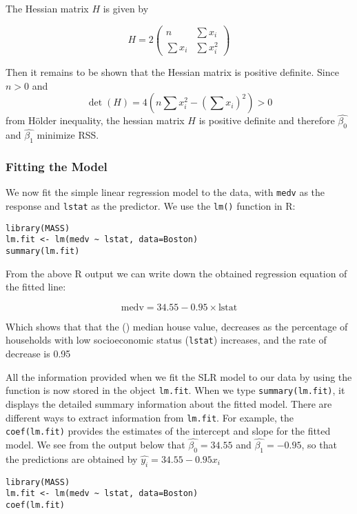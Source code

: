 \documentclass[11pt]{article}
\begin{document}
The Hessian matrix \( H \) is given by

\[H = 2 \begin{pmatrix}
n & \sum x_i \\
\sum x_i & \sum x_i^2
\end{pmatrix}\]

Then it remains to be shown that the Hessian matrix is positive definite. Since \(n > 0\) and \[\det(H) = 4(n \sum x_i^2 - (\sum x_i)^2) > 0\] from Hölder inequality, the hessian matrix $H$ is positive definite and therefore \(\hat{\beta_0}\) and \( \hat{\beta_1}\) minimize RSS.

\subsubsection{Fitting the Model}

We now fit the simple linear regression model to the data, with \texttt{medv} as the response and \texttt{lstat} as the predictor. We use the \texttt{lm()} function in R:

\begin{verbatim}
library(MASS)
lm.fit <- lm(medv ~ lstat, data=Boston)
summary(lm.fit)
\end{verbatim}

From the above R output we can write down the obtained regression equation of the ﬁtted line:

\[\text{medv} = 34.55 - 0.95 \times \text{lstat}\]

Which shows that that the () median house value, decreases as the percentage of households with low socioeconomic status (\texttt{lstat}) increases, and the rate of decrease is 0.95

All the information provided when we ﬁt the SLR model to our data by using the  function is now stored in the object \texttt{lm.fit}.
When we type \texttt{summary(lm.fit)}, it displays the detailed summary information about the fitted model. There are diﬀerent ways to extract information from \texttt{lm.fit}. For example, the \texttt{coef(lm.fit)} provides the estimates of the intercept and slope for the fitted model. We see from the output below that $\hat{\beta_0} = 34.55$ and $\hat{\beta_1} = -0.95$, so that the predictions are obtained by $\hat{y_i} = 34.55 - 0.95x_i$

\begin{verbatim}
library(MASS)
lm.fit <- lm(medv ~ lstat, data=Boston)
coef(lm.fit)
\end{verbatim}
\end{document}
